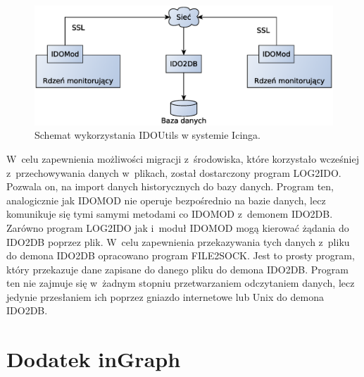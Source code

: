 \begin{figure}[h]
  \caption{Schemat wykorzystania IDOUtils w systemie Icinga.}
  \label{fig:IDOUtils}
\includegraphics[width=1\textwidth]{img/idoutils}
\end{figure}

W~celu zapewnienia możliwości migracji z~środowiska, które korzystało
wcześniej z~przechowywania danych w~plikach, został dostarczony
program LOG2IDO. Pozwala on, na import danych historycznych do bazy
danych. Program ten, analogicznie jak IDOMOD nie operuje bezpośrednio
na bazie danych, lecz komunikuje się tymi samymi metodami co IDOMOD
z~demonem IDO2DB. Zarówno program LOG2IDO jak i~moduł IDOMOD mogą
kierować żądania do IDO2DB poprzez plik. W~celu zapewnienia
przekazywania tych danych z~pliku do demona IDO2DB opracowano program
FILE2SOCK. Jest to prosty program, który przekazuje dane zapisane do
danego pliku do demona IDO2DB. Program ten nie zajmuje się w~żadnym
stopniu przetwarzaniem odczytaniem danych, lecz jedynie przesłaniem ich
poprzez gniazdo internetowe lub Unix do demona IDO2DB.

\section[Dodatek inGraph][Dodatek inGraph]{Dodatek inGraph}
\label{sec:inGraph}

